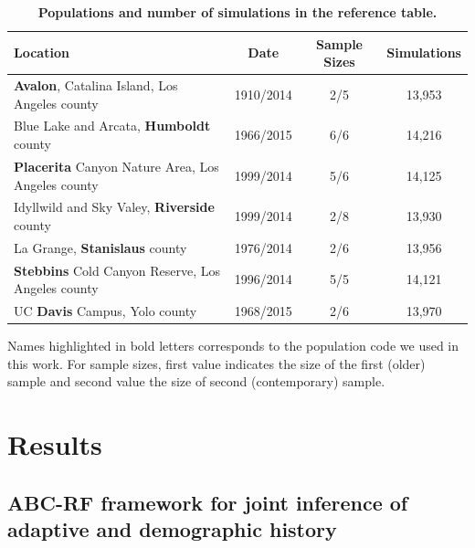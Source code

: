 \documentclass[a4paper, 12pt]{article}
\begin{document}
\begin{table}[!ht]
\small
 \caption{\textbf{Populations and number of simulations in the reference table.}}
  \centering
  \begin{tabular}{lccc}
   \cmidrule(r){1-4}
    Location                                                  &Date      &Sample Sizes   &Simulations \\
    \midrule               
    \textbf{Avalon}, Catalina Island, Los Angeles county      &1910/2014 &2/5 &13,953      \\ 
    Blue Lake and Arcata, \textbf{Humboldt} county            &1966/2015 &6/6 &14,216      \\ 
    \textbf{Placerita} Canyon Nature Area, Los Angeles county &1999/2014 &5/6 &14,125      \\ 
    Idyllwild and Sky Valey, \textbf{Riverside} county        &1999/2014 &2/8 &13,930      \\ 
    La Grange, \textbf{Stanislaus} county                     &1976/2014 &2/6 &13,956      \\ 
    \textbf{Stebbins} Cold Canyon Reserve, Los Angeles county &1996/2014 &5/5 &14,121      \\ 
    UC \textbf{Davis} Campus, Yolo county                     &1968/2015 &2/6 &13,970      \\ 
    \bottomrule
  \end{tabular}
  \begin{tablenotes}
      \small
      \item Names highlighted in bold letters corresponds to the population code we used in this work. For sample sizes, first value indicates the size of the first (older) sample and second value the size of second (contemporary) sample.
  
  \end{tablenotes}
  \label{tab:feralbees}
\end{table}



\section*{Results}

\subsection*{ABC-RF framework for joint inference of adaptive and demographic history}
\end{document}

